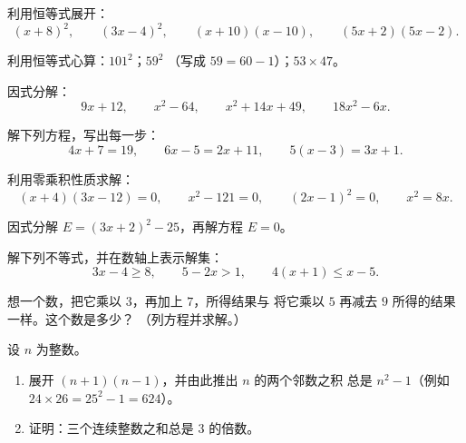 \begin{exercise}[$\star$]\label{exo:g9:algebra:2}
利用恒等式展开：
\[
(x + 8)^2, \qquad
(3x - 4)^2, \qquad
(x + 10)(x - 10), \qquad
(5x + 2)(5x - 2).
\]
\end{exercise}

\begin{exercise}[$\star$]\label{exo:g9:algebra:3}
利用恒等式心算：$101^2$；\quad $59^2$
（写成 $59 = 60 - 1$）；\quad $53 \times 47$。
\end{exercise}

\begin{exercise}[$\star$]\label{exo:g9:algebra:4}
因式分解：
\[
9x + 12, \qquad
x^2 - 64, \qquad
x^2 + 14x + 49, \qquad
18x^2 - 6x .
\]
\end{exercise}

\begin{exercise}[$\star$]\label{exo:g9:algebra:5}
解下列方程，写出每一步：
\[
4x + 7 = 19, \qquad
6x - 5 = 2x + 11, \qquad
5(x - 3) = 3x + 1 .
\]
\end{exercise}

\begin{exercise}[$\star\star$]\label{exo:g9:algebra:6}
利用零乘积性质求解：
\[
(x + 4)(3x - 12) = 0, \qquad
x^2 - 121 = 0, \qquad
(2x - 1)^2 = 0, \qquad
x^2 = 8x .
\]
\end{exercise}

\begin{exercise}[$\star\star$]\label{exo:g9:algebra:7}
因式分解 $E = (3x + 2)^2 - 25$，再解方程 $E = 0$。
\end{exercise}

\begin{exercise}[$\star\star$]\label{exo:g9:algebra:8}
解下列不等式，并在数轴上表示解集：
\[
3x - 4 \geq 8, \qquad
5 - 2x > 1, \qquad
4(x + 1) \leq x - 5 .
\]
\end{exercise}

\begin{exercise}[$\star\star$]\label{exo:g9:algebra:9}
想一个数，把它乘以 $3$，再加上 $7$，所得结果与
将它乘以 $5$ 再减去 $9$ 所得的结果一样。这个数是多少？
（列方程并求解。）
\end{exercise}

\begin{exercise}[$\star\star\star$]\label{exo:g9:algebra:10}
设 $n$ 为整数。
\begin{enumerate}
  \item 展开 $(n + 1)(n - 1)$，并由此推出 $n$ 的两个邻数之积
        总是 $n^2 - 1$（例如 $24 \times 26 =
        25^2 - 1 = 624$）。
  \item 证明：三个连续整数之和总是
        $3$ 的倍数。
\end{enumerate}
\end{exercise}

